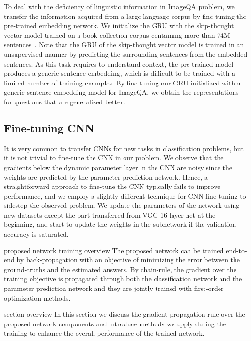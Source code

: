 \documentclass[10pt,twocolumn,letterpaper]{article}
\begin{document}
To deal with the deficiency of linguistic information in ImageQA problem, we transfer the information acquired from a large language corpus by fine-tuning the pre-trained embedding network.
We initialize the GRU with the skip-thought vector model trained on a book-collection corpus containing more than 74M sentences~\cite{Skipthought}.
Note that the GRU of the skip-thought vector model is trained in an unsupervised manner by predicting the surrounding sentences from the embedded sentences.
As this task requires to understand context, the pre-trained model produces a generic sentence embedding, which is difficult to be trained with a limited number of training examples.
By fine-tuning our GRU initialized with a generic sentence embedding model for ImageQA, we obtain the representations for questions that are generalized better.



\subsection{Fine-tuning CNN}



It is very common to transfer CNNs for new tasks in classification problems, but it is not trivial to fine-tune the CNN in our problem.
We observe that the gradients below the dynamic parameter layer in the CNN are noisy since the weights are predicted by the parameter prediction network.
Hence, a straightforward approach to fine-tune the CNN typically fails to improve performance, and we employ a slightly different technique for CNN fine-tuning to sidestep the observed problem. 
We update the parameters of the network using new datasets except the part transferred from VGG 16-layer net at the beginning, and start to update the weights in the subnetwork if the validation accuracy is saturated.




\iffalse
{\color{blue} proposed network training overview}
The proposed network can be trained end-to-end by back-propagation with an objective of minimizing the error between the ground-truths and the estimated answers.
By chain-rule, the gradient over the training objective is propagated through both the classification network and the parameter prediction network and they are {\color{cyan}jointly} trained with first-order optimization methods.

{\color{blue} section overview}
{\color{cyan}In this} section {\color{cyan}we discuss} the gradient propagation rule over the proposed network components and introduce methods we apply during the training to enhance the overall performance of the trained network.
\end{document}
